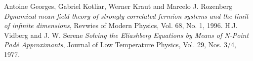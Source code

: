 \begin{thebibliography}{9}


  Antoine Georges, Gabriel Kotliar, Werner Kraut and Marcelo J. Rozenberg
  \emph{Dynamical mean-field theory of strongly correlated fermion systems and the limit of infinite dimensions},
  Revwies of Modern Physics,
  Vol. 68, No. 1,
  1996.
  H.J. Vidberg and J. W. Serene
  \emph{Solving the Eliashberg Equations by Means of N-Point Padé Approximants},
  Journal of Low Temperature Physics,
  Vol. 29, Nos. 3/4,
  1977.
\end{thebibliography}
